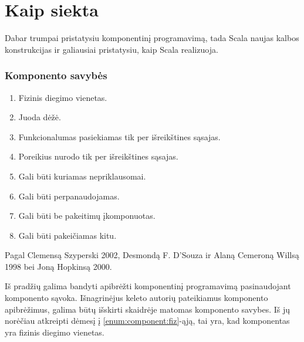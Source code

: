 \section{Kaip siekta}

\begin{handout}
  Dabar trumpai pristatysiu komponentinį programavimą, tada Scala
  naujas kalbos konstrukcijas ir galiausiai pristatysiu, kaip
  Scala realizuoja.
\end{handout}

\begin{frame}
  \frametitle{Komponento savybės}
  \begin{enumerate}
    \item \label{enum:component:fiz} Fizinis diegimo vienetas.
    \item Juoda dėžė.
    \item Funkcionalumas pasiekiamas tik per išreikštines sąsajas.
    \item \label{enum:component:req} Poreikius nurodo tik per
      išreikštines sąsajas.
    \item Gali būti kuriamas nepriklausomai.
    \item Gali būti perpanaudojamas.
    \item Gali būti be pakeitimų įkomponuotas.
    \item Gali būti pakeičiamas kitu.
  \end{enumerate}
  Pagal Clemensą Szyperski 2002, Desmondą F. D'Souza ir Alaną Cemeroną
  Willsą 1998 bei Joną Hopkinsą 2000.
  \begin{handout}
    Iš pradžių galima bandyti apibrėžti komponentinį programavimą
    pasinaudojant komponento sąvoka. Išnagrinėjus keleto autorių
    pateikiamus komponento apibrėžimus, galima būtų išskirti skaidrėje
    matomas  komponento savybes. Iš jų norėčiau
    atkreipti dėmesį į \ref{enum:component:fiz}-ąją, tai yra, kad
    komponentas yra fizinis diegimo vienetas.
  \end{handout}
\end{frame}

